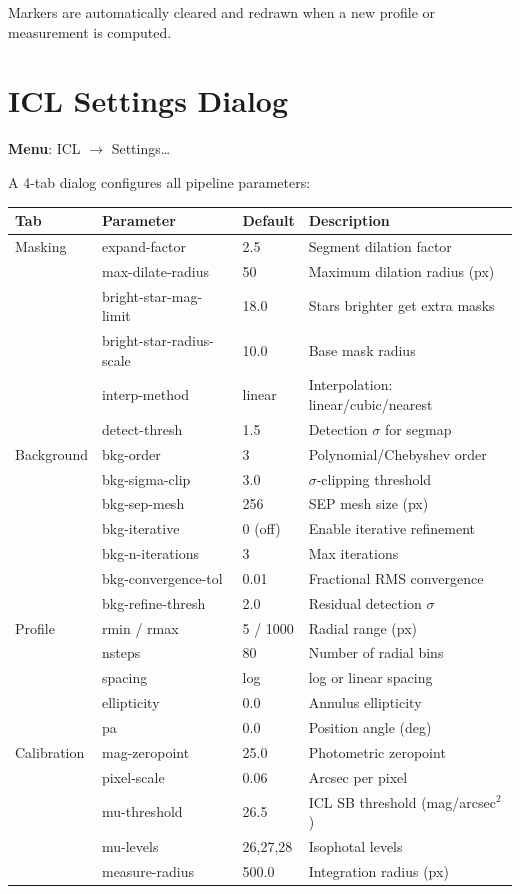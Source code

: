 \documentclass[11pt,fleqn]{book}
\begin{document}
Markers are automatically cleared and redrawn when a new profile or measurement is computed.


\section{ICL Settings Dialog}
\label{sec:icl-settings}

\textbf{Menu}: ICL $\to$ Settings\ldots

A 4-tab dialog configures all pipeline parameters:

\begin{center}
\begin{longtable}{L{2.5cm} L{3.5cm} L{2cm} L{4.5cm}}
\toprule
\textbf{Tab} & \textbf{Parameter} & \textbf{Default} & \textbf{Description} \\
\midrule
\endhead
Masking & expand-factor & 2.5 & Segment dilation factor \\
 & max-dilate-radius & 50 & Maximum dilation radius (px) \\
 & bright-star-mag-limit & 18.0 & Stars brighter get extra masks \\
 & bright-star-radius-scale & 10.0 & Base mask radius \\
 & interp-method & linear & Interpolation: linear/cubic/nearest \\
 & detect-thresh & 1.5 & Detection $\sigma$ for segmap \\
\midrule
Background & bkg-order & 3 & Polynomial/Chebyshev order \\
 & bkg-sigma-clip & 3.0 & $\sigma$-clipping threshold \\
 & bkg-sep-mesh & 256 & SEP mesh size (px) \\
 & bkg-iterative & 0 (off) & Enable iterative refinement \\
 & bkg-n-iterations & 3 & Max iterations \\
 & bkg-convergence-tol & 0.01 & Fractional RMS convergence \\
 & bkg-refine-thresh & 2.0 & Residual detection $\sigma$ \\
\midrule
Profile & rmin / rmax & 5 / 1000 & Radial range (px) \\
 & nsteps & 80 & Number of radial bins \\
 & spacing & log & log or linear spacing \\
 & ellipticity & 0.0 & Annulus ellipticity \\
 & pa & 0.0 & Position angle (deg) \\
\midrule
Calibration & mag-zeropoint & 25.0 & Photometric zeropoint \\
 & pixel-scale & 0.06 & Arcsec per pixel \\
 & mu-threshold & 26.5 & ICL SB threshold (mag/arcsec$^2$) \\
 & mu-levels & 26,27,28 & Isophotal levels \\
 & measure-radius & 500.0 & Integration radius (px) \\
\bottomrule
\end{longtable}
\end{center}
\end{document}
